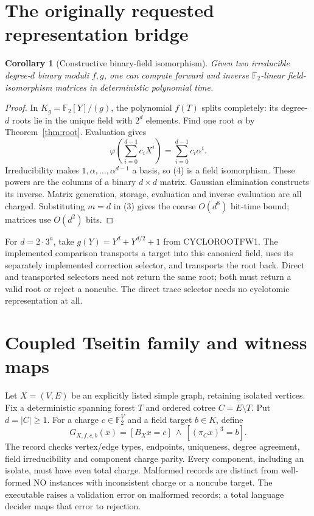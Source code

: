 \documentclass[11pt]{article}
\newtheorem{corollary}[theorem]{Corollary}
\newcommand{\F}{\mathbb F}
\begin{document}
\section{The originally requested representation bridge}
\begin{corollary}[Constructive binary-field isomorphism]\label{cor:iso}
Given two irreducible degree-$d$ binary moduli $f,g$, one can compute
forward and inverse $\F_2$-linear field-isomorphism matrices in deterministic
polynomial time.
\end{corollary}
\begin{proof}
In $K_g=\F_2[Y]/(g)$, the polynomial $f(T)$ splits completely: its degree-$d$
roots lie in the unique field with $2^d$ elements. Find one root $\alpha$
by Theorem~\ref{thm:root}. Evaluation gives
\[
 \varphi\left(\sum_{i=0}^{d-1}c_iX^i\right)
       =\sum_{i=0}^{d-1}c_i\alpha^i.                    \tag{4}
\]
Irreducibility makes $1,\alpha,\ldots,\alpha^{d-1}$ a basis, so (4) is a
field isomorphism. These powers are the columns of a binary $d\times d$
matrix. Gaussian elimination constructs its inverse. Matrix generation,
storage, evaluation and inverse evaluation are all charged. Substituting
$m=d$ in (3) gives the coarse $O(d^8)$ bit-time bound; matrices use $O(d^2)$ bits.
\end{proof}

For $d=2\cdot3^a$, take $g(Y)=Y^d+Y^{d/2}+1$ from CYCLOROOTFW1.
The implemented comparison transports a target into this canonical field,
uses its separately implemented correction selector, and transports the
root back. Direct and transported selectors need not return the same root;
both must return a valid root or reject a noncube. The direct trace selector
needs no cyclotomic representation at all.

\section{Coupled Tseitin family and witness maps}
Let $X=(V,E)$ be an explicitly listed simple graph, retaining isolated
vertices. Fix a deterministic spanning forest $T$ and ordered cotree
$C=E\setminus T$. Put $d=|C|\ge1$. For a charge $c\in\F_2^V$ and a field
target $b\in K$, define
\[
 G_{X,f,c,b}(x)=[B_Xx=c]\ \land\ [(\pi_Cx)^3=b].        \tag{5}
\]
The record checks vertex/edge types, endpoints, uniqueness, degree agreement,
field irreducibility and component charge parity. Every component, including
an isolate, must have even total charge. Malformed records are distinct from
well-formed NO instances with inconsistent charge or a noncube target.
The executable raises a validation error on malformed records; a total
language decider maps that error to rejection.
\end{document}
